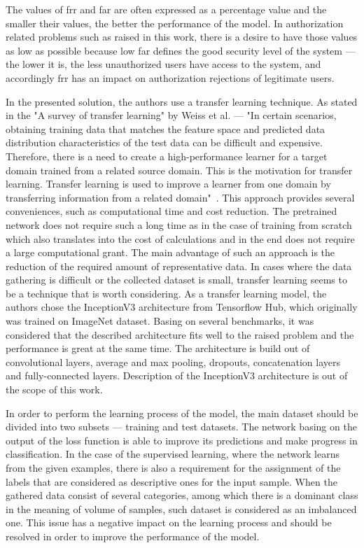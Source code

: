 The values of \gls{frr} and \gls{far} are often expressed as a percentage value and the smaller their values, the better the performance of the model.
In authorization related problems such as raised in this work, there is a desire to have those values as low as possible because low \gls{far} defines the good security level of the system --- the lower it is, the less unauthorized users have access to the system, and accordingly \gls{frr} has an impact on authorization rejections of legitimate users.

In the presented solution, the authors use a transfer learning technique.
As stated in the "A survey of transfer learning" by Weiss et al. --- "In certain scenarios, obtaining training data that matches the feature space and predicted data distribution characteristics of the test data can be difficult and expensive.
Therefore, there is a need to create a high-performance learner for a target domain trained from a related source domain.
This is the motivation for transfer learning.
Transfer learning is used to improve a learner from one domain by transferring information from a related domain"~\cite{transfer-learning-def}.
This approach provides several conveniences, such as computational time and cost reduction.
The pretrained network does not require such a long time as in the case of training from scratch which also translates into the cost of calculations and in the end does not require a large computational grant.
The main advantage of such an approach is the reduction of the required amount of representative data.
In cases where the data gathering is difficult or the collected dataset is small, transfer learning seems to be a technique that is worth considering.
As a transfer learning model, the authors chose the InceptionV3 architecture from Tensorflow Hub, which originally was trained on ImageNet dataset.
Basing on several benchmarks, it was considered that the described architecture fits well to the raised problem and the performance is great at the same time.
The architecture is build out of convolutional layers, average and max pooling, dropouts, concatenation layers and fully-connected layers.
Description of the InceptionV3 architecture is out of the scope of this work.

In order to perform the learning process of the model, the main dataset should be divided into two subsets --- training and test datasets.
The network basing on the output of the loss function is able to improve its predictions and make progress in classification.
In the case of the supervised learning, where the network learns from the given examples, there is also a requirement for the assignment of the labels that are considered as descriptive ones for the input sample.
When the gathered data consist of several categories, among which there is a dominant class in the meaning of volume of samples, such dataset is considered as an imbalanced one.
This issue has a negative impact on the learning process and should be resolved in order to improve the performance of the model.
